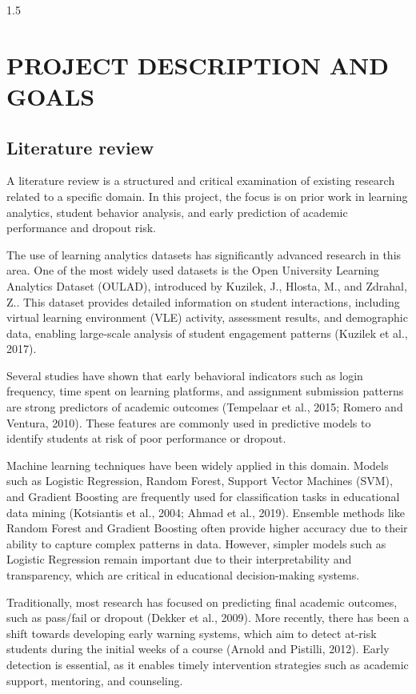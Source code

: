 \begin{spacing}{1.5}


\chapter{\MakeUppercase{Project Description and Goals}}
\section{Literature review}



A literature review is a structured and critical examination of existing research related to a specific domain. In this project, the focus is on prior work in learning analytics, student behavior analysis, and early prediction of academic performance and dropout risk.

The use of learning analytics datasets has significantly advanced research in this area. One of the most widely used datasets is the Open University Learning Analytics Dataset (OULAD), introduced by Kuzilek, J., Hlosta, M., and Zdrahal, Z.. This dataset provides detailed information on student interactions, including virtual learning environment (VLE) activity, assessment results, and demographic data, enabling large-scale analysis of student engagement patterns (Kuzilek et al., 2017).

Several studies have shown that early behavioral indicators such as login frequency, time spent on learning platforms, and assignment submission patterns are strong predictors of academic outcomes (Tempelaar et al., 2015; Romero and Ventura, 2010). These features are commonly used in predictive models to identify students at risk of poor performance or dropout.

Machine learning techniques have been widely applied in this domain. Models such as Logistic Regression, Random Forest, Support Vector Machines (SVM), and Gradient Boosting are frequently used for classification tasks in educational data mining (Kotsiantis et al., 2004; Ahmad et al., 2019). Ensemble methods like Random Forest and Gradient Boosting often provide higher accuracy due to their ability to capture complex patterns in data. However, simpler models such as Logistic Regression remain important due to their interpretability and transparency, which are critical in educational decision-making systems.

Traditionally, most research has focused on predicting final academic outcomes, such as pass/fail or dropout (Dekker et al., 2009). More recently, there has been a shift towards developing early warning systems, which aim to detect at-risk students during the initial weeks of a course (Arnold and Pistilli, 2012). Early detection is essential, as it enables timely intervention strategies such as academic support, mentoring, and counseling.


\end{spacing}
